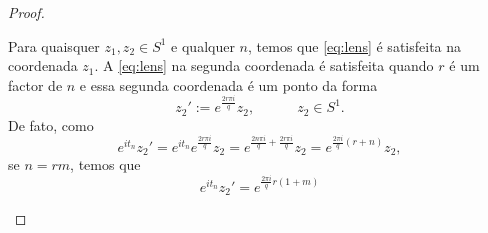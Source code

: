 \begin{proof}
\begin{enumerate}[label=(\alph*)]
\begin{enumerate}[label=(\roman*)]

\iffalse
Para quaisquer \(z_1,z_2 \in S^1\) e qualquer \(n\), temos que \cref{eq:lens} é satisfeita na coordenada \(z_1\). A \cref{eq:lens} na segunda coordenada é satisfeita quando \(r\) é um factor de \(n\) e essa segunda coordenada é um ponto da forma
\[z_2':=e^{\frac{2r\pi i}{q}}z_2, \qquad \quad z_2 \in S^1.\]
De fato, como
\[e^{it_n}z_2'=e^{it_n}e^{\frac{2r\pi i}{q}}z_2=e^{\frac{2n\pi i}{q}+\frac{2r\pi i}{q}}z_2=e^{\frac{2\pi i }{q}(r+n)}z_2,\]
se \(n=rm\), temos que
 \[e^{it_n}z_2'=e^{\frac{2\pi i }{q}r(1+m)}\]



\end{enumerate}
\end{enumerate}
\end{proof}
